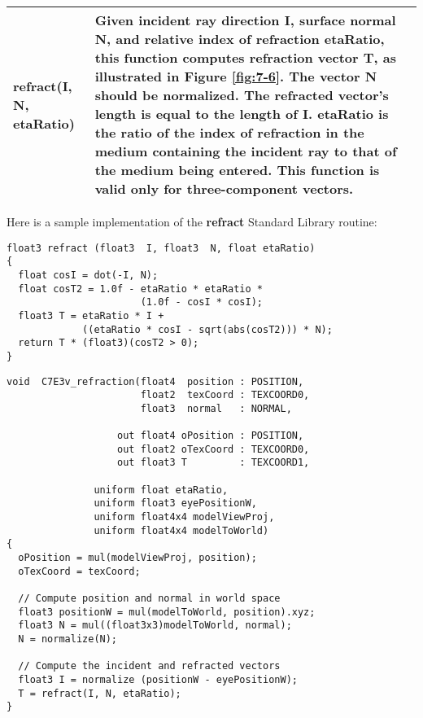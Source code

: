 \documentclass[../main.tex]{subfiles}
\begin{document}
\FloatBarrier
\begin{table}
\centering
\begin{tabular}{ p{4cm} p{10cm}  } 
\hline
\textbf{refract(I, N, etaRatio)} & Given incident ray direction \textbf{I}, surface normal \textbf{N}, and relative index of refraction \textbf{etaRatio}, this function computes refraction vector \textbf{T}, as illustrated in Figure \ref{fig:7-6}. The vector \textbf{N} should be normalized. The refracted vector's length is equal to the length of \textbf{I}. \textbf{etaRatio} is the ratio of the index of refraction in the medium containing the incident ray to that of the medium being entered. This function is valid only for three-component vectors. \\
\hline
\end{tabular}
\end{table}
\FloatBarrier

Here is a sample implementation of the \textbf{refract} Standard Library routine:

\FloatBarrier
\begin{lstlisting}
float3 refract (float3  I, float3  N, float etaRatio)
{
  float cosI = dot(-I, N);
  float cosT2 = 1.0f - etaRatio * etaRatio *
                       (1.0f - cosI * cosI);
  float3 T = etaRatio * I +
             ((etaRatio * cosI - sqrt(abs(cosT2))) * N);
  return T * (float3)(cosT2 > 0);
}
\end{lstlisting}
\FloatBarrier

\FloatBarrier
\begin{lstlisting}[caption=Example 7-3. The \textbf{C7E3v_refraction} Vertex Program]
void  C7E3v_refraction(float4  position : POSITION,
                       float2  texCoord : TEXCOORD0,
                       float3  normal   : NORMAL,

                   out float4 oPosition : POSITION,
                   out float2 oTexCoord : TEXCOORD0,
                   out float3 T         : TEXCOORD1,

               uniform float etaRatio,
               uniform float3 eyePositionW,
               uniform float4x4 modelViewProj,
               uniform float4x4 modelToWorld)
{
  oPosition = mul(modelViewProj, position);
  oTexCoord = texCoord;

  // Compute position and normal in world space
  float3 positionW = mul(modelToWorld, position).xyz;
  float3 N = mul((float3x3)modelToWorld, normal);
  N = normalize(N);

  // Compute the incident and refracted vectors
  float3 I = normalize (positionW - eyePositionW);
  T = refract(I, N, etaRatio);
}
\end{lstlisting}
\FloatBarrier
\end{document}
